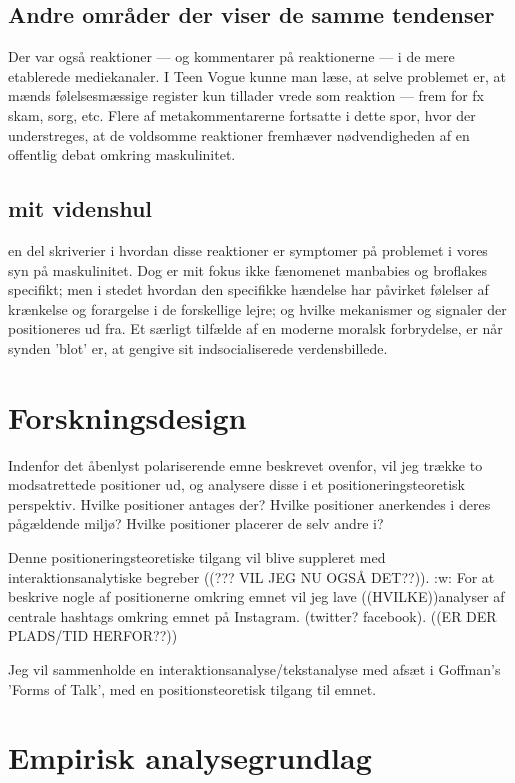 \subsection{Andre områder der viser de samme tendenser} 

Der var også reaktioner — og kommentarer på reaktionerne — i de
mere etablerede mediekanaler. I Teen Vogue kunne man læse, at
selve problemet er, at mænds følelsesmæssige register kun tillader
vrede som reaktion — frem for fx skam, sorg, etc. Flere af
metakommentarerne fortsatte i dette spor, hvor der understreges,
at de voldsomme reaktioner fremhæver nødvendigheden af en
offentlig debat omkring maskulinitet. 

\subsection{mit videnshul}

en del skriverier i hvordan disse reaktioner er symptomer på
problemet i vores syn på maskulinitet. Dog er mit fokus ikke
fænomenet manbabies og broflakes specifikt; men i stedet hvordan
den specifikke hændelse har påvirket følelser af krænkelse og
forargelse i de forskellige lejre; og hvilke mekanismer og
signaler der positioneres ud fra. Et særligt tilfælde af en
moderne moralsk forbrydelse, er når synden 'blot' er, at gengive
sit indsocialiserede verdensbillede.

\section{Forskningsdesign} 

Indenfor det åbenlyst polariserende emne beskrevet ovenfor, vil
jeg trække to modsatrettede positioner ud, og analysere disse i et
positioneringsteoretisk perspektiv. Hvilke positioner antages
der? Hvilke positioner anerkendes i deres pågældende miljø? Hvilke
positioner placerer de selv andre i?

Denne positioneringsteoretiske tilgang vil blive suppleret med
interaktionsanalytiske begreber ((??? VIL JEG NU OGSÅ DET??)).
:w: For at beskrive nogle af positionerne omkring emnet vil jeg
lave ((HVILKE))analyser af centrale hashtags omkring emnet på
Instagram.   (twitter?  facebook). ((ER DER PLADS/TID HERFOR??))


Jeg vil sammenholde en interaktionsanalyse/tekstanalyse med afsæt
i Goffman's 'Forms of Talk', med en positionsteoretisk tilgang til
emnet. 


\section{Empirisk analysegrundlag}


